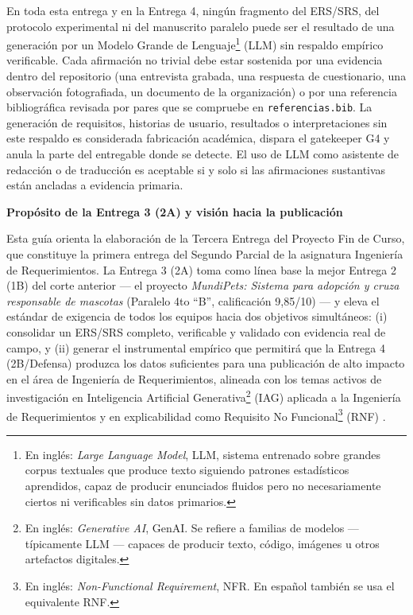 \documentclass[11pt,a4paper]{article}
\newcounter{secc}
\newcommand{\secband}[1]{%
    \stepcounter{secc}\par\vspace{9pt}\noindent
    {\setlength{\fboxsep}{0pt}%
        \colorbox{uteqgold}{\parbox[c][20pt][c]{0.05\textwidth}{\centering\textbf{\color{white}\small \arabic{secc}}}}%
        \colorbox{uteqgreen}{\parbox[c][20pt][c]{0.95\textwidth}{\hspace{8pt}\textbf{\color{white}\small #1}}}%
    }\par\vspace{5pt}}
\begin{document}
\begin{alertbox}[title=Advertencia global sobre la generación de texto sin evidencia empírica]
En toda esta entrega y en la Entrega 4, ningún fragmento del ERS/SRS, del protocolo experimental ni del manuscrito paralelo puede ser el resultado de una generación por un Modelo Grande de Lenguaje\footnote{En inglés: \emph{Large Language Model}, LLM, sistema entrenado sobre grandes corpus textuales que produce texto siguiendo patrones estadísticos aprendidos, capaz de producir enunciados fluidos pero no necesariamente ciertos ni verificables sin datos primarios.} (LLM) sin respaldo empírico verificable. Cada afirmación no trivial debe estar sostenida por una evidencia dentro del repositorio (una entrevista grabada, una respuesta de cuestionario, una observación fotografiada, un documento de la organización) o por una referencia bibliográfica revisada por pares que se compruebe en \texttt{referencias.bib}. La generación de requisitos, historias de usuario, resultados o interpretaciones sin este respaldo es considerada fabricación académica, dispara el gatekeeper G4 y anula la parte del entregable donde se detecte. El uso de LLM como asistente de redacción o de traducción es aceptable si y solo si las afirmaciones sustantivas están ancladas a evidencia primaria.
\end{alertbox}

\secband{Propósito de la Entrega 3 (2A) y visión hacia la publicación}

Esta guía orienta la elaboración de la Tercera Entrega del Proyecto Fin de Curso, que constituye la primera entrega del Segundo Parcial de la asignatura Ingeniería de Requerimientos.
La Entrega 3 (2A) toma como línea base la mejor Entrega 2 (1B) del corte anterior --- el proyecto \emph{MundiPets: Sistema para adopción y cruza responsable de mascotas} (Paralelo 4to ``B'', calificación 9,85/10) --- y eleva el estándar de exigencia de todos los equipos hacia dos objetivos simultáneos: (i) consolidar un ERS/SRS completo, verificable y validado con evidencia real de campo, y (ii) generar el instrumental empírico que permitirá que la Entrega 4 (2B/Defensa) produzca los datos suficientes para una publicación de alto impacto en el área de Ingeniería de Requerimientos, alineada con los temas activos de investigación en Inteligencia Artificial Generativa\footnote{En inglés: \emph{Generative AI}, GenAI. Se refiere a familias de modelos --- típicamente LLM --- capaces de producir texto, código, imágenes u otros artefactos digitales.} (IAG) aplicada a la Ingeniería de Requerimientos \cite{cheng2026genai,arora2024llm4re,vogelsang2024llm} y en explicabilidad como Requisito No Funcional\footnote{En inglés: \emph{Non-Functional Requirement}, NFR. En español también se usa el equivalente RNF.} (RNF) \cite{chazette2020nfr,chazette2021exploring,chazette2022explainable}.
\end{document}
